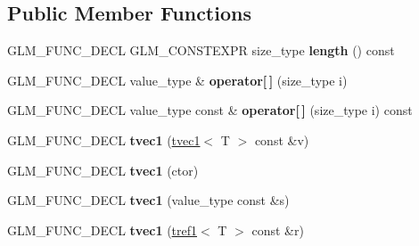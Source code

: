 \subsection*{Public Member Functions}
\begin{DoxyCompactItemize}
\item 
\hypertarget{structglm_1_1detail_1_1tvec1_a36558123300b2a66c51b62a17bee3657}{}G\+L\+M\+\_\+\+F\+U\+N\+C\+\_\+\+D\+E\+C\+L G\+L\+M\+\_\+\+C\+O\+N\+S\+T\+E\+X\+P\+R size\+\_\+type {\bfseries length} () const \label{structglm_1_1detail_1_1tvec1_a36558123300b2a66c51b62a17bee3657}

\item 
\hypertarget{structglm_1_1detail_1_1tvec1_a20e586dbb0fdfd345c66250a776b1246}{}G\+L\+M\+\_\+\+F\+U\+N\+C\+\_\+\+D\+E\+C\+L value\+\_\+type \& {\bfseries operator\mbox{[}$\,$\mbox{]}} (size\+\_\+type i)\label{structglm_1_1detail_1_1tvec1_a20e586dbb0fdfd345c66250a776b1246}

\item 
\hypertarget{structglm_1_1detail_1_1tvec1_ad8458f51c2f212caf4f1a66ca507514b}{}G\+L\+M\+\_\+\+F\+U\+N\+C\+\_\+\+D\+E\+C\+L value\+\_\+type const \& {\bfseries operator\mbox{[}$\,$\mbox{]}} (size\+\_\+type i) const \label{structglm_1_1detail_1_1tvec1_ad8458f51c2f212caf4f1a66ca507514b}

\item 
\hypertarget{structglm_1_1detail_1_1tvec1_a223f0b0626a866f6d6eff1110623a20d}{}G\+L\+M\+\_\+\+F\+U\+N\+C\+\_\+\+D\+E\+C\+L {\bfseries tvec1} (\hyperlink{structglm_1_1detail_1_1tvec1}{tvec1}$<$ T $>$ const \&v)\label{structglm_1_1detail_1_1tvec1_a223f0b0626a866f6d6eff1110623a20d}

\item 
\hypertarget{structglm_1_1detail_1_1tvec1_a6a152450aeaad0f0f87e5bc3f8b0bf84}{}G\+L\+M\+\_\+\+F\+U\+N\+C\+\_\+\+D\+E\+C\+L {\bfseries tvec1} (ctor)\label{structglm_1_1detail_1_1tvec1_a6a152450aeaad0f0f87e5bc3f8b0bf84}

\item 
\hypertarget{structglm_1_1detail_1_1tvec1_a4ad3cf1387e53c9b86958ffca9010b57}{}G\+L\+M\+\_\+\+F\+U\+N\+C\+\_\+\+D\+E\+C\+L {\bfseries tvec1} (value\+\_\+type const \&s)\label{structglm_1_1detail_1_1tvec1_a4ad3cf1387e53c9b86958ffca9010b57}

\item 
\hypertarget{structglm_1_1detail_1_1tvec1_a3520e427bc4946bb1b38b9727dcc5d8f}{}G\+L\+M\+\_\+\+F\+U\+N\+C\+\_\+\+D\+E\+C\+L {\bfseries tvec1} (\hyperlink{structglm_1_1detail_1_1tref1}{tref1}$<$ T $>$ const \&r)\label{structglm_1_1detail_1_1tvec1_a3520e427bc4946bb1b38b9727dcc5d8f}


\end{DoxyCompactItemize}
